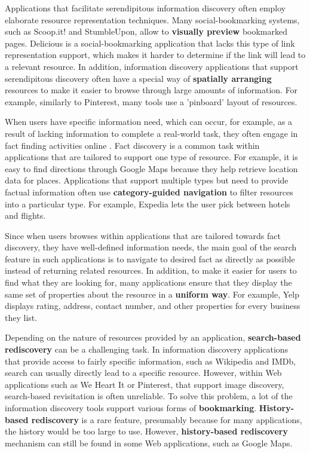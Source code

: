 \documentclass{casconpaper}
\begin{document}
{Applications that facilitate serendipitous information discovery often employ elaborate resource representation techniques. Many social-bookmarking systems, such as Scoop.it! and StumbleUpon, allow to \textbf{visually preview} bookmarked pages. Delicious is a social-bookmarking application that lacks this type of link representation support, which makes it harder to determine if the link will lead to a relevant resource. In addition, information discovery applications that support serendipitous discovery often have a special way of \textbf{spatially arranging} resources to make it easier to browse through large amounts of information. For example, similarly to Pinterest, many tools use a 'pinboard' layout of resources.

When users have specific information need, which can occur, for example, as a result of lacking information to complete a real-world task, they often engage in fact finding activities online \cite{kellar2006, kellar2007, sellen}. Fact discovery is a common task within applications that are tailored to support one type of resource. For example, it is easy to find directions through Google Maps because they help retrieve location data for places. Applications that support multiple types but need to provide factual information often use \textbf{category-guided navigation} \cite{levene} to filter resources into a particular type. For example, Expedia lets the user pick between hotels and flights. 

Since when users browses within applications that are tailored towards fact discovery, they have well-defined information needs, the main goal of the search feature in such applications is to navigate to desired fact as directly as possible instead of returning related resources. In addition, to make it easier for users to find what they are looking for, many applications ensure that they display the same set of properties about the resource in a \textbf{uniform way}. For example, Yelp displays rating, address, contact number, and other properties for every business they list.

Depending on the nature of resources provided by an application, \textbf{search-based rediscovery} can be a challenging task. In information discovery applications that provide access to fairly specific information, such as Wikipedia and IMDb, search can usually directly lead to a specific resource. However, within Web applications such as We Heart It or Pinterest, that support image discovery, search-based revisitation is often unreliable. To solve this problem, a lot of the information discovery tools support various forms of \textbf{bookmarking}. \textbf{History-based rediscovery} is a rare feature, presumably because for many applications, the history would be too large to use. However, \textbf{history-based rediscovery} mechanism can still be found in some Web applications, such as Google Maps.

}
\end{document}
